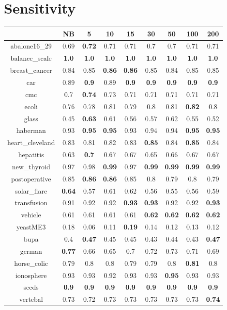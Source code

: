 \documentclass{article}%
\begin{document}
%
\section*{Sensitivity}%
\begin{tabular}{c|cccccccc}%
\hline%
&NB&5&10&15&30&50&100&200\\%
\hline%
abalone16\_29&0.69&\textbf{0.72}&0.71&0.71&0.7&0.7&0.71&0.71\\%
\hline%
balance\_scale&\textbf{1.0}&\textbf{1.0}&\textbf{1.0}&\textbf{1.0}&\textbf{1.0}&\textbf{1.0}&\textbf{1.0}&\textbf{1.0}\\%
\hline%
breast\_cancer&0.84&0.85&\textbf{0.86}&\textbf{0.86}&0.85&0.84&0.85&0.85\\%
\hline%
car&0.89&\textbf{0.9}&0.89&\textbf{0.9}&\textbf{0.9}&\textbf{0.9}&\textbf{0.9}&\textbf{0.9}\\%
\hline%
cmc&0.7&\textbf{0.74}&0.73&0.71&0.71&0.71&0.71&0.71\\%
\hline%
ecoli&0.76&0.78&0.81&0.79&0.8&0.81&\textbf{0.82}&0.8\\%
\hline%
glass&0.45&\textbf{0.63}&0.61&0.56&0.57&0.62&0.55&0.52\\%
\hline%
haberman&0.93&\textbf{0.95}&\textbf{0.95}&0.93&0.94&0.94&\textbf{0.95}&\textbf{0.95}\\%
\hline%
heart\_cleveland&0.83&0.81&0.82&0.83&\textbf{0.85}&0.84&\textbf{0.85}&0.84\\%
\hline%
hepatitis&0.63&\textbf{0.7}&0.67&0.67&0.65&0.66&0.67&0.67\\%
\hline%
new\_thyroid&0.97&0.98&\textbf{0.99}&0.97&\textbf{0.99}&\textbf{0.99}&\textbf{0.99}&\textbf{0.99}\\%
\hline%
postoperative&0.85&\textbf{0.86}&\textbf{0.86}&0.85&0.8&0.79&0.8&0.79\\%
\hline%
solar\_flare&\textbf{0.64}&0.57&0.61&0.62&0.56&0.55&0.56&0.59\\%
\hline%
transfusion&0.91&0.92&0.92&\textbf{0.93}&\textbf{0.93}&0.92&0.92&\textbf{0.93}\\%
\hline%
vehicle&0.61&0.61&0.61&0.61&\textbf{0.62}&\textbf{0.62}&\textbf{0.62}&\textbf{0.62}\\%
\hline%
yeastME3&0.18&0.06&0.11&\textbf{0.19}&0.14&0.12&0.13&0.12\\%
\hline%
bupa&0.4&\textbf{0.47}&0.45&0.45&0.43&0.44&0.43&\textbf{0.47}\\%
\hline%
german&\textbf{0.77}&0.66&0.65&0.7&0.72&0.73&0.71&0.69\\%
\hline%
horse\_colic&0.79&0.8&0.8&0.79&0.79&0.8&\textbf{0.81}&0.8\\%
\hline%
ionosphere&0.93&0.93&0.92&0.93&0.93&\textbf{0.95}&0.93&0.93\\%
\hline%
seeds&\textbf{0.9}&\textbf{0.9}&\textbf{0.9}&\textbf{0.9}&\textbf{0.9}&\textbf{0.9}&\textbf{0.9}&\textbf{0.9}\\%
\hline%
vertebal&0.73&0.72&0.73&0.73&0.73&0.73&0.73&\textbf{0.74}\\%
\hline%
\end{tabular}
\end{document}

